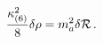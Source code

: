 \begin{equation}\label{rhoflu}
{{\kappa_{(6)} ^2} \over 8} \delta\rho = m_a ^2 \delta{\cal R} \, .
\end{equation}

